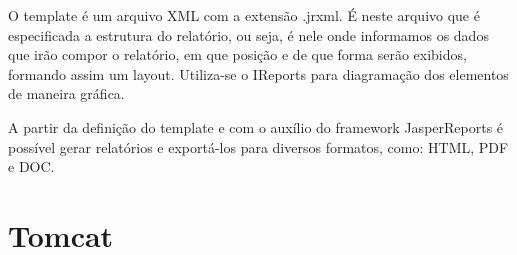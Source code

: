 O template é um arquivo XML com a extensão .jrxml. É neste arquivo que é especificada a estrutura do relatório, ou seja, é nele onde informamos os dados que irão compor o relatório, em que posição e de que forma serão exibidos, formando assim um layout. Utiliza-se o IReports para diagramação dos elementos de maneira gráfica.

A partir da definição do template e com o auxílio do framework JasperReports é possível gerar relatórios e exportá-los para diversos formatos, como: HTML, PDF e DOC.

\section{Tomcat}
\label{sec:embasamentoTeoricoTomcat}

